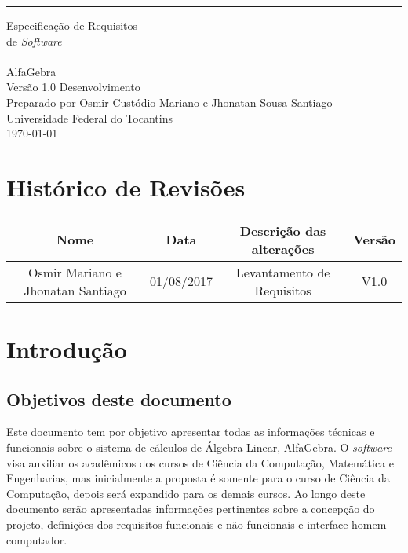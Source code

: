 \documentclass{scrreprt}
\date{}
\def\myversion{1.0 }
\begin{document}
\begin{flushright}
    \rule{16cm}{5pt}\vskip1cm
    \begin{bfseries}
        \Huge{Especificação de Requisitos\\ de \textit{Software}}\\ 
        \vspace{1.9cm}
        \\
        \vspace{1.9cm}
        AlfaGebra\\
        \vspace{1.9cm}
        \LARGE{Versão \myversion Desenvolvimento}\\
        \vspace{1.9cm}
        Preparado por Osmir Custódio Mariano e Jhonatan Sousa Santiago\\
        \vspace{1.9cm}
        Universidade Federal do Tocantins\\
        \vspace{1.9cm}
        \today\\
    \end{bfseries}
\end{flushright}

\tableofcontents


\chapter*{Histórico de Revisões}

\begin{center}
    \begin{tabular}{|c|c|c|c|}
        \hline
	    Nome & Data & Descrição das alterações & Versão\\
        \hline
	    Osmir Mariano e Jhonatan Santiago & 01/08/2017 & Levantamento de Requisitos & V1.0\\
        \hline
    \end{tabular}
\end{center}

\chapter{Introdução}

\section{Objetivos deste documento}
Este documento tem por objetivo apresentar todas as informações técnicas e funcionais sobre o sistema de cálculos de Álgebra Linear, AlfaGebra. O \textit{software} visa auxiliar os acadêmicos dos cursos de Ciência da Computação, Matemática e Engenharias, mas inicialmente a proposta é somente para o curso de Ciência da Computação, depois será expandido para os demais cursos. Ao longo deste documento serão apresentadas informações pertinentes sobre a concepção do projeto, definições dos requisitos funcionais e não funcionais e interface homem-computador.
\end{document}
